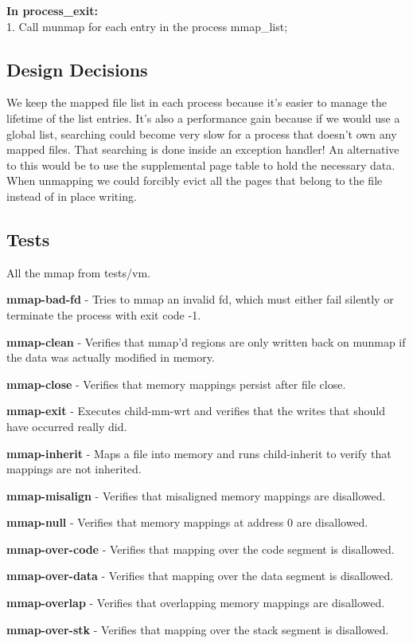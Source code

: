 	 \textbf{In process\_exit:}
	\\1. Call munmap for each entry in the process mmap\_list;


\subsection{Design Decisions}
We keep the mapped file list in each process because it's easier to manage the lifetime of the list entries. It's also a performance gain because if we would use a global list, searching could become very slow for a process that doesn't own any mapped files. That searching is done inside an exception handler! An alternative to this would be to use the supplemental page table to hold the necessary data.
\\When unmapping we could forcibly evict all the pages that belong to the file instead of in place writing.
\subsection{Tests}
All the mmap from tests/vm.


\textbf{mmap-bad-fd} - Tries to mmap an invalid fd, which must either fail silently or terminate the process with exit code -1.


\textbf{mmap-clean} - Verifies that mmap'd regions are only written back on munmap if the data was actually modified in memory.


\textbf{mmap-close} - Verifies that memory mappings persist after file close.


\textbf{mmap-exit} - Executes child-mm-wrt and verifies that the writes that should  have occurred really did.


\textbf{mmap-inherit} - Maps a file into memory and runs child-inherit to verify that  mappings are not inherited.


\textbf{mmap-misalign} - Verifies that misaligned memory mappings are disallowed.


\textbf{mmap-null} - Verifies that memory mappings at address 0 are disallowed.


\textbf{mmap-over-code} - Verifies that mapping over the code segment is disallowed.


\textbf{mmap-over-data} - Verifies that mapping over the data segment is disallowed.


\textbf{mmap-overlap} - Verifies that overlapping memory mappings are disallowed.


\textbf{mmap-over-stk} - Verifies that mapping over the stack segment is disallowed.


